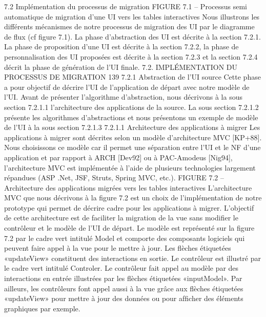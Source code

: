 \documentclass{article}
\begin{document}
7.2
Impl\'{e}mentation du processus de migration
FIGURE 7.1 – Processus semi automatique de migration d’une UI vers les tables interactives
Nous illustrons les diff\'{e}rents m\'{e}canismes de notre processus de migration des UI par le diagramme de ﬂux (cf ﬁgure 7.1).
La phase d’abstraction des UI est d\'{e}crite \`{a} la section 7.2.1. La phase de proposition d’une UI est
d\'{e}crite \`{a} la section 7.2.2, la phase de personnalisation des UI propos\'{e}es est d\'{e}crite \`{a} la section 7.2.3
et la section 7.2.4 d\'{e}crit la phase de g\'{e}n\'{e}ration de l’UI ﬁnale.
7.2. IMPLÉMENTATION DU PROCESSUS DE MIGRATION
139
7.2.1
Abstraction de l’UI source
Cette phase a pour objectif de d\'{e}crire l’UI de l’application de d\'{e}part avec notre mod\`{e}le de l’UI.
Avant de pr\'{e}senter l’algorithme d’abstraction, nous d\'{e}crivons \`{a} la sous section 7.2.1.1 l’architecture
des applications de la source. La sous section 7.2.1.2 pr\'{e}sente les algorithmes d’abstractions et nous
pr\'{e}sentons un exemple de mod\`{e}le de l’UI \`{a} la sous section 7.2.1.3
7.2.1.1
Architecture des applications \`{a} migrer
Les applications \`{a} migrer sont d\'{e}crites selon un mod\`{e}le d’architecture MVC [KP+88]. Nous choisissons ce mod\`{e}le car il permet une s\'{e}paration entre l’UI et le NF d’une application et par rapport \`{a}
ARCH [Dev92] ou \`{a} PAC-Amodeus [Nig94], l’architecture MVC est impl\'{e}ment\'{e}e \`{a} l’aide de plusieurs technologies largement r\'{e}pandues (ASP .Net, JSF, Struts, Spring MVC, etc.).
FIGURE 7.2 – Architecture des applications migr\'{e}es vers les tables interactives
L’architecture MVC que nous d\'{e}crivons \`{a} la ﬁgure 7.2 est un choix de l’impl\'{e}mentation de notre
prototype qui permet de d\'{e}crire cadre pour les applications \`{a} migrer. L’objectif de cette architecture
est de faciliter la migration de la vue sans modiﬁer le contr\^{o}leur et le mod\`{e}le de l’UI de d\'{e}part.
Le mod\`{e}le est repr\'{e}sent\'{e} sur la ﬁgure 7.2 par le cadre vert intitul\'{e} Model et comporte des composants logiciels qui peuvent faire appel \`{a} la vue pour le mettre \`{a} jour. Les ﬂ\`{e}ches \'{e}tiquet\'{e}es «updateView» constituent des interactions en sortie.
Le contr\^{o}leur est illustr\'{e} par le cadre vert intitul\'{e} Controler. Le contr\^{o}leur fait appel au mod\`{e}le par des interactions en entr\'{e}e illustr\'{e}es par les ﬂ\`{e}ches \'{e}tiquet\'{e}es «inputModel». Par ailleurs, les
contr\^{o}leurs font appel aussi \`{a} la vue gr\^{a}ce aux ﬂ\`{e}ches \'{e}tiquet\'{e}es «updateView» pour mettre \`{a} jour des
donn\'{e}es ou pour afﬁcher des \'{e}l\'{e}ments graphiques par exemple.
\end{document}
